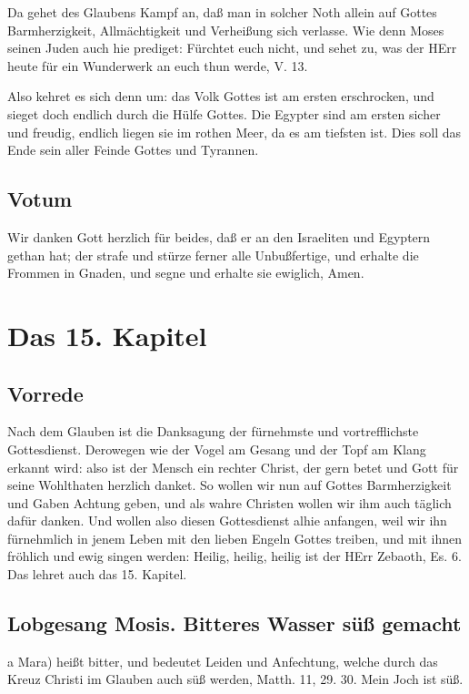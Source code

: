 Da gehet des Glaubens Kampf an, daß man in solcher Noth allein auf Gottes Barmherzigkeit, Allmächtigkeit und Verheißung sich verlasse. Wie denn Moses seinen Juden auch hie prediget: Fürchtet euch nicht, und sehet zu, was der HErr heute für ein Wunderwerk an euch thun werde, V. 13.

Also kehret es sich denn um: das Volk Gottes ist am ersten erschrocken, und sieget doch endlich durch die Hülfe Gottes. Die Egypter sind am ersten sicher und freudig, endlich liegen sie im rothen Meer, da es am tiefsten ist. Dies soll das Ende sein aller Feinde Gottes und Tyrannen.

\section{Votum}

Wir danken Gott herzlich für beides, daß er an den Israeliten und Egyptern gethan hat; der strafe und stürze ferner alle Unbußfertige, und erhalte die Frommen in Gnaden, und segne und erhalte sie ewiglich, Amen.

\chapter{Das 15. Kapitel}

\section{Vorrede}

Nach dem Glauben ist die Danksagung der fürnehmste und vortrefflichste Gottesdienst. Derowegen wie der Vogel am Gesang und der Topf am Klang erkannt wird: also ist der Mensch ein rechter Christ, der gern betet und Gott für seine Wohlthaten herzlich danket. So wollen wir nun auf Gottes Barmherzigkeit und Gaben Achtung geben, und als wahre Christen wollen wir ihm auch täglich dafür danken. Und wollen also diesen Gottesdienst alhie anfangen, weil wir ihn fürnehmlich in jenem Leben mit den lieben Engeln Gottes treiben, und mit ihnen fröhlich und ewig singen werden: Heilig, heilig, heilig ist der HErr Zebaoth, Es. 6. Das lehret auch das 15. Kapitel.

\section{Lobgesang Mosis. Bitteres Wasser süß gemacht}

a Mara) heißt bitter, und bedeutet Leiden und Anfechtung, welche durch das Kreuz Christi im Glauben auch süß werden, Matth. 11, 29. 30. Mein Joch ist süß.

